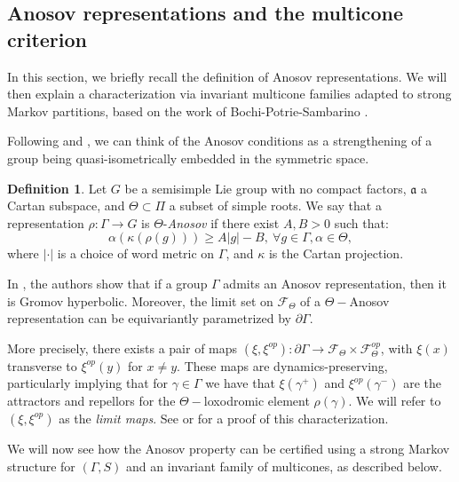 \documentclass{amsart}
\theoremstyle{remark}
\theoremstyle{definition}
\newtheorem{defi}[thm]{Definition}
\begin{document}
\subsection{Anosov representations and the multicone criterion}

In this section, we briefly recall the definition of Anosov representations. 
We will then explain a characterization via invariant multicone families adapted to strong Markov partitions, based on the work of Bochi-Potrie-Sambarino \cite{bochi2019anosov}.

Following \cite{bochi2019anosov} and \cite{kapovich2017anosov}, we can think of the Anosov conditions as a strengthening of a group being quasi-isometrically embedded in the symmetric space.

\begin{defi}
 Let $G$ be a semisimple Lie group with no compact factors, $\mathfrak{a}$ a Cartan subspace, and $\Theta \subset \Pi$ a subset of simple roots.
 We say that a representation $\rho : \Gamma \rightarrow G$ is $\Theta$-\emph{Anosov} if there exist $A,B >0$ such that:
    $$\alpha (\kappa (\rho (g))) \geq A |g| - B,\: \forall g \in \Gamma, \alpha \in \Theta,$$
 where $|\cdot|$ is a choice of word metric on $\Gamma$, and $\kappa$ is the Cartan projection.    
\end{defi}

In \cite{kapovich2017anosov}, the authors show that if a group $\Gamma$ admits an Anosov representation, then it is Gromov hyperbolic.
Moreover, the limit set on $\mathcal{F}_\Theta$ of a $\Theta-$Anosov representation can be equivariantly parametrized by $\partial\Gamma$.

More precisely, there exists a pair of maps $(\xi,\xi^{op}): \partial \Gamma \rightarrow \mathcal{F}_\Theta \times \mathcal{F}_\Theta^{op}$, with $\xi(x)$ transverse to $\xi^{op}(y)$ for $x \neq y$. These maps are dynamics-preserving, particularly implying that for $\gamma \in \Gamma$ we have that $\xi (\gamma^+)$ and $\xi^{op} (\gamma^-)$ are the attractors and repellors for the $\Theta-$loxodromic element $\rho (\gamma)$.
We will refer to $(\xi,\xi^{op})$ as the \emph{limit maps}.
See \cite{bochi2019anosov} or \cite{kapovich2017anosov} for a proof of this characterization.

We will now see how the Anosov property can be certified using a strong Markov structure for $(\Gamma, S)$ and an invariant family of multicones, as described below.
\end{document}
